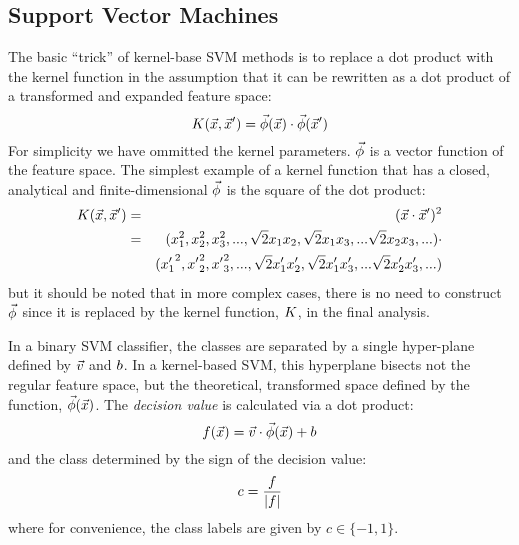 \documentclass[11pt]{article}
\begin{document}
\subsection{Support Vector Machines}

The basic ``trick'' of kernel-base SVM methods is to replace a dot product
with the kernel function in the assumption that it can be rewritten
as a dot product of a transformed and expanded feature space:
\begin{equation}
	K(\vec {x}, \vec {x}^\prime) = \vec\phi(\vec {x}) \cdot \vec\phi(\vec {x}^\prime)
\end{equation}
For simplicity we have ommitted the kernel parameters.
$\vec\phi$ is a vector function of the feature space.
The simplest example of a kernel function that has a closed, analytical and
finite-dimensional $\vec\phi$ is the square of the dot product:
\begin{eqnarray}
	K(\vec {x}, \vec {x}^\prime) & = & (\vec {x} \cdot \vec {x}^\prime)^2 \\ \nonumber
					 & = & (x_1^2, x_2^2, x_3^2, ..., \sqrt{2} x_1 x_2, \sqrt{2} x_1 x_3, ... \sqrt{2} x_2 x_3, ...) \cdot \\ \nonumber
      & &	 ({x^\prime_1}^2, {x^\prime}_2^2, {x^\prime}_3^2, ..., \sqrt{2} x^\prime_1 x^\prime_2, \sqrt{2} x^\prime_1 x^\prime_3, ... \sqrt{2} x^\prime_2 x^\prime_3, ...) 
\end{eqnarray}
but it should be noted that in more complex cases, 
there is no need to construct $\vec\phi$ since it is replaced by the 
kernel function, $K$, in the final analysis.

In a binary SVM classifier, the classes are separated by a single hyper-plane
defined by $\vec v$ and $b$.
In a kernel-based SVM, this hyperplane bisects not the regular feature
space, but the theoretical, transformed space defined by the function,
$\vec\phi(\vec {x})$.
The {\it decision value} is calculated via a dot product:
\begin{equation}
	f(\vec {x})=\vec v \cdot \vec\phi(\vec {x}) + b
	\label{decision_function0}
\end{equation}
and the class determined by the sign of the decision value:
\begin{equation}
	c=\frac{f}{|f|}
	\label{class_value}
\end{equation}
where for convenience, the class labels are given by $c \in \lbrace -1, 1 \rbrace$.
\end{document}
